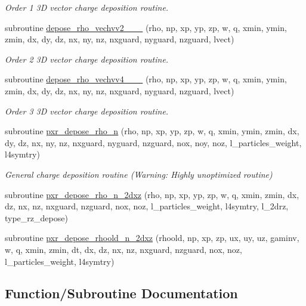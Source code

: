 \begin{DoxyCompactItemize}
\begin{DoxyCompactList}\small\item\em Order 1 3D vector charge deposition routine. \end{DoxyCompactList}\item 
subroutine \hyperlink{charge__deposition_8_f90_a618d3787267c54578f40d084c4d915e3}{depose\+\_\+rho\+\_\+vechvv2\+\_\+\_\+\_} (rho, np, xp, yp, zp, w, q, xmin, ymin, zmin, dx, dy, dz, nx, ny, nz, nxguard, nyguard, nzguard, lvect)
\begin{DoxyCompactList}\small\item\em Order 2 3D vector charge deposition routine. \end{DoxyCompactList}\item 
subroutine \hyperlink{charge__deposition_8_f90_a55f64905a5f5c387baef1cdddfc060f7}{depose\+\_\+rho\+\_\+vechvv4\+\_\+\_\+\_} (rho, np, xp, yp, zp, w, q, xmin, ymin, zmin, dx, dy, dz, nx, ny, nz, nxguard, nyguard, nzguard, lvect)
\begin{DoxyCompactList}\small\item\em Order 3 3D vector charge deposition routine. \end{DoxyCompactList}\item 
subroutine \hyperlink{charge__deposition_8_f90_a1ba91732b5b34c8c04f7570c8df67c26}{pxr\+\_\+depose\+\_\+rho\+\_\+n} (rho, np, xp, yp, zp, w, q, xmin, ymin, zmin, dx, dy, dz, nx, ny, nz, nxguard, nyguard, nzguard, nox, noy, noz, l\+\_\+particles\+\_\+weight, l4symtry)
\begin{DoxyCompactList}\small\item\em General charge deposition routine (Warning\+: Highly unoptimized routine) \end{DoxyCompactList}\item 
subroutine \hyperlink{charge__deposition_8_f90_a899c2820e69c525f781f0a6c62d3b116}{pxr\+\_\+depose\+\_\+rho\+\_\+n\+\_\+2dxz} (rho, np, xp, yp, zp, w, q, xmin, zmin, dx, dz, nx, nz, nxguard, nzguard, nox, noz, l\+\_\+particles\+\_\+weight, l4symtry, l\+\_\+2drz, type\+\_\+rz\+\_\+depose)
\item 
subroutine \hyperlink{charge__deposition_8_f90_a496878f2bdf85d8dec4a059d6bc40a0f}{pxr\+\_\+depose\+\_\+rhoold\+\_\+n\+\_\+2dxz} (rhoold, np, xp, zp, ux, uy, uz, gaminv, w, q, xmin, zmin, dt, dx, dz, nx, nz, nxguard, nzguard, nox, noz, l\+\_\+particles\+\_\+weight, l4symtry)
\end{DoxyCompactItemize}


\subsection{Function/\+Subroutine Documentation}
